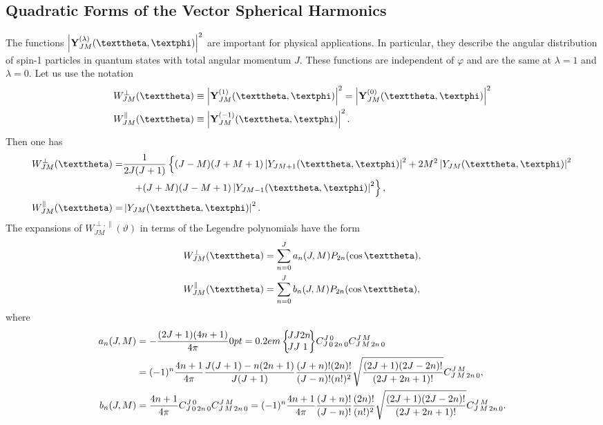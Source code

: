 \subsection{Quadratic Forms of the Vector Spherical Harmonics}\label{sec:7.3.17}
The functions $\left|\vect{Y}_{J M}^{(\lambda)}(\vartheta, \varphi)\right|^{2}$ are important for physical applications. In particular, they describe the angular distribution of spin-1 particles in quantum states with total angular momentum $J$. These functions are independent of $\varphi$ and are the same at $\lambda=1$ and $\lambda=0$. Let us use the notation
\begin{align}
& W_{J M}^{\perp}(\vartheta) \equiv\left|\vect{Y}_{J M}^{(1)}(\vartheta, \varphi)\right|^{2}=\left|\vect{Y}_{J M}^{(0)}(\vartheta, \varphi)\right|^{2}  \label{eq:7:3:154}\\
& W_{J M}^{\|}(\vartheta) \equiv\left|\vect{Y}_{J M}^{(-1)}(\vartheta, \varphi)\right|^{2}. \notag
\end{align}
Then one has
\begin{align}
W_{J M}^{\perp}(\vartheta)= & \frac{1}{2 J(J+1)}\left\{(J-M)(J+M+1)\left|Y_{J M+1}(\vartheta, \varphi)\right|^{2}+2 M^{2}\left|Y_{J M}(\vartheta, \varphi)\right|^{2}\right. \notag\\
& \left.\quad+(J+M)(J-M+1)\left|Y_{J M-1}(\vartheta, \varphi)\right|^{2}\right\} , \label{eq:7:3:155}\\
W_{J M}^{\|}(\vartheta)= & \left|Y_{J M}(\vartheta, \varphi)\right|^{2}. \notag
\end{align}
The expansions of $W_{J M}^{\perp, \|}(\vartheta)$ in terms of the Legendre polynomials have the form
\begin{align}
& W_{J M}^{\perp}(\vartheta)=\sum_{n=0}^{J} a_{n}(J, M) P_{2 n}(\cos \vartheta) , \notag\\
& W_{J M}^{\|}(\vartheta)=\sum_{n=0}^{J} b_{n}(J, M) P_{2 n}(\cos \vartheta), \label{eq:7:3:156}
\end{align}
where
\begin{align}
a_{n}(J, M) & =-\frac{(2 J+1)(4 n+1)}{4 \pi}\sixj{J}{J}{2 n}{J}{J}{1} \clebsch{J}{0}{2n}{0}{J}{0} \clebsch{J}{M}{2n}{0}{J}{M}  \notag\\
& =(-1)^{n} \frac{4 n+1}{4 \pi} \frac{J(J+1)-n(2 n+1)}{J(J+1)} \frac{(J+n)!(2 n)!}{(J-n)!(n!)^{2}} \sqrt{\frac{(2 J+1)(2 J-2 n)!}{(2 J+2 n+1)!}} \clebsch{J}{M}{2n}{0}{J}{M}, \label{eq:7:3:157}\\
b_{n}(J, M) & =\frac{4 n+1}{4 \pi} \clebsch{J}{0}{2n}{0}{J}{0} \clebsch{J}{M}{2n}{0}{J}{M}=(-1)^{n} \frac{4 n+1}{4 \pi} \frac{(J+n)!}{(J-n)!} \frac{(2 n)!}{(n!)^{2}} \sqrt{\frac{(2 J+1)(2 J-2 n)!}{(2 J+2 n+1)!}} \clebsch{J}{M}{2n}{0}{J}{M} . \label{eq:7:3:158}
\end{align}
